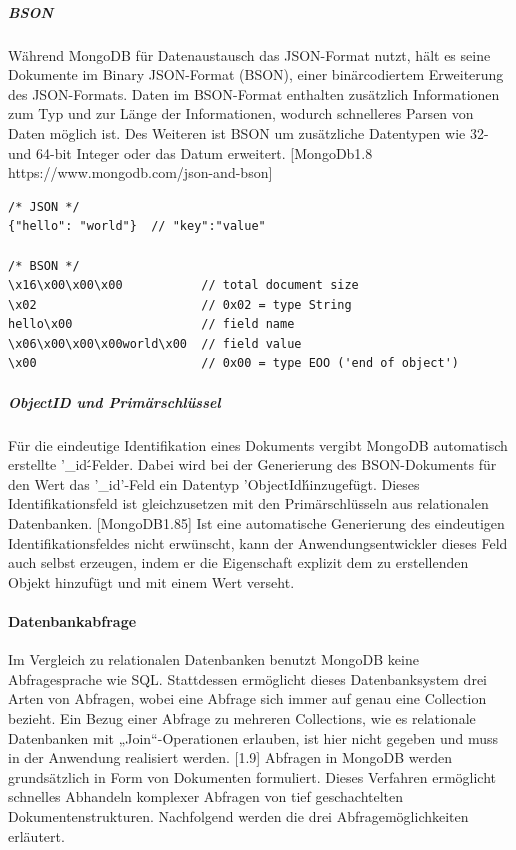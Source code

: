 \subparagraph{BSON}
Während MongoDB für Datenaustausch das JSON-Format nutzt, hält es seine Dokumente im Binary JSON-Format (BSON), einer binärcodiertem Erweiterung des JSON-Formats. Daten im BSON-Format enthalten zusätzlich Informationen zum Typ und zur Länge der Informationen, wodurch schnelleres Parsen von Daten möglich ist. Des Weiteren ist BSON um zusätzliche Datentypen wie 32- und 64-bit Integer oder das Datum erweitert. [MongoDb1.8 https://www.mongodb.com/json-and-bson] 
\newline

\begin{lstlisting}
/* JSON */
{"hello": "world"}  // "key":"value"

/* BSON */
\x16\x00\x00\x00           // total document size
\x02                       // 0x02 = type String
hello\x00                  // field name
\x06\x00\x00\x00world\x00  // field value
\x00                       // 0x00 = type EOO ('end of object')
\end{lstlisting}



\subparagraph{ObjectID und Primärschlüssel}
Für die eindeutige Identifikation eines Dokuments vergibt MongoDB automatisch erstellte '\_id\'-Felder. Dabei wird bei der Generierung des BSON-Dokuments für den Wert das '\_id'-Feld ein Datentyp 'ObjectId\'  hinzugefügt. Dieses Identifikationsfeld ist gleichzusetzen mit den Primärschlüsseln aus relationalen Datenbanken. [MongoDB1.85] Ist eine automatische Generierung des eindeutigen Identifikationsfeldes nicht erwünscht, kann der Anwendungsentwickler dieses Feld auch selbst erzeugen, indem er die Eigenschaft explizit dem zu erstellenden Objekt hinzufügt und mit einem Wert verseht. 
\newline


\paragraph{Datenbankabfrage}
Im Vergleich zu relationalen Datenbanken benutzt MongoDB keine Abfragesprache wie SQL. Stattdessen ermöglicht dieses Datenbanksystem drei Arten von Abfragen, wobei eine Abfrage sich immer auf genau eine Collection bezieht. Ein Bezug einer Abfrage zu mehreren Collections, wie es relationale Datenbanken mit „Join“-Operationen erlauben, ist hier nicht gegeben und muss in der Anwendung realisiert werden. [1.9] Abfragen in MongoDB werden grundsätzlich in Form von Dokumenten formuliert. Dieses Verfahren ermöglicht schnelles Abhandeln komplexer Abfragen von tief geschachtelten Dokumentenstrukturen. Nachfolgend werden die drei Abfragemöglichkeiten erläutert.


